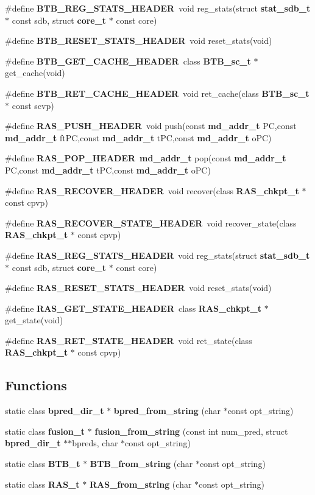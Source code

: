 \begin{CompactItemize}
\#define {\bf BTB\_\-REG\_\-STATS\_\-HEADER}~void reg\_\-stats(struct {\bf stat\_\-sdb\_\-t} $\ast$ const sdb, struct {\bf core\_\-t} $\ast$ const core)
\item 
\#define {\bf BTB\_\-RESET\_\-STATS\_\-HEADER}~void reset\_\-stats(void)
\item 
\#define {\bf BTB\_\-GET\_\-CACHE\_\-HEADER}~class {\bf BTB\_\-sc\_\-t} $\ast$ get\_\-cache(void)
\item 
\#define {\bf BTB\_\-RET\_\-CACHE\_\-HEADER}~void ret\_\-cache(class {\bf BTB\_\-sc\_\-t} $\ast$ const scvp)
\item 
\#define {\bf RAS\_\-PUSH\_\-HEADER}~void push(const {\bf md\_\-addr\_\-t} PC,const {\bf md\_\-addr\_\-t} ftPC,const {\bf md\_\-addr\_\-t} tPC,const {\bf md\_\-addr\_\-t} oPC)
\item 
\#define {\bf RAS\_\-POP\_\-HEADER}~{\bf md\_\-addr\_\-t} pop(const {\bf md\_\-addr\_\-t} PC,const {\bf md\_\-addr\_\-t} tPC,const {\bf md\_\-addr\_\-t} oPC)
\item 
\#define {\bf RAS\_\-RECOVER\_\-HEADER}~void recover(class {\bf RAS\_\-chkpt\_\-t} $\ast$ const cpvp)
\item 
\#define {\bf RAS\_\-RECOVER\_\-STATE\_\-HEADER}~void recover\_\-state(class {\bf RAS\_\-chkpt\_\-t} $\ast$ const cpvp)
\item 
\#define {\bf RAS\_\-REG\_\-STATS\_\-HEADER}~void reg\_\-stats(struct {\bf stat\_\-sdb\_\-t} $\ast$ const sdb, struct {\bf core\_\-t} $\ast$ const core)
\item 
\#define {\bf RAS\_\-RESET\_\-STATS\_\-HEADER}~void reset\_\-stats(void)
\item 
\#define {\bf RAS\_\-GET\_\-STATE\_\-HEADER}~class {\bf RAS\_\-chkpt\_\-t} $\ast$ get\_\-state(void)
\item 
\#define {\bf RAS\_\-RET\_\-STATE\_\-HEADER}~void ret\_\-state(class {\bf RAS\_\-chkpt\_\-t} $\ast$ const cpvp)
\end{CompactItemize}
\subsection*{Functions}
\begin{CompactItemize}
\item 
static class {\bf bpred\_\-dir\_\-t} $\ast$ {\bf bpred\_\-from\_\-string} (char $\ast$const opt\_\-string)
\item 
static class {\bf fusion\_\-t} $\ast$ {\bf fusion\_\-from\_\-string} (const int num\_\-pred, struct {\bf bpred\_\-dir\_\-t} $\ast$$\ast$bpreds, char $\ast$const opt\_\-string)
\item 
static class {\bf BTB\_\-t} $\ast$ {\bf BTB\_\-from\_\-string} (char $\ast$const opt\_\-string)
\item 
static class {\bf RAS\_\-t} $\ast$ {\bf RAS\_\-from\_\-string} (char $\ast$const opt\_\-string)
\end{CompactItemize}


